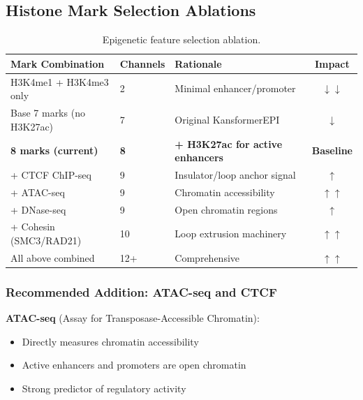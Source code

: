 \documentclass[11pt,a4paper]{article}
\begin{document}
\subsection{Histone Mark Selection Ablations}

\begin{table}[H]
\centering
\begin{tabular}{L{4cm}L{3cm}L{4cm}c}
\toprule
\textbf{Mark Combination} & \textbf{Channels} & \textbf{Rationale} & \textbf{Impact} \\
\midrule
H3K4me1 + H3K4me3 only & 2 & Minimal enhancer/promoter & \textcolor{negative}{$\downarrow\downarrow$} \\
Base 7 marks (no H3K27ac) & 7 & Original KansformerEPI & \textcolor{negative}{$\downarrow$} \\
\textbf{8 marks (current)} & \textbf{8} & \textbf{+ H3K27ac for active enhancers} & \textbf{Baseline} \\
+ CTCF ChIP-seq & 9 & Insulator/loop anchor signal & \textcolor{positive}{$\uparrow$} \\
+ ATAC-seq & 9 & Chromatin accessibility & \textcolor{positive}{$\uparrow\uparrow$} \\
+ DNase-seq & 9 & Open chromatin regions & \textcolor{positive}{$\uparrow$} \\
+ Cohesin (SMC3/RAD21) & 10 & Loop extrusion machinery & \textcolor{positive}{$\uparrow\uparrow$} \\
All above combined & 12+ & Comprehensive & \textcolor{positive}{$\uparrow\uparrow$} \\
\bottomrule
\end{tabular}
\caption{Epigenetic feature selection ablation.}
\end{table}

\subsubsection{Recommended Addition: ATAC-seq and CTCF}

\textbf{ATAC-seq} (Assay for Transposase-Accessible Chromatin):
\begin{itemize}
    \item Directly measures chromatin accessibility
    \item Active enhancers and promoters are open chromatin
    \item Strong predictor of regulatory activity
\end{itemize}
\end{document}
